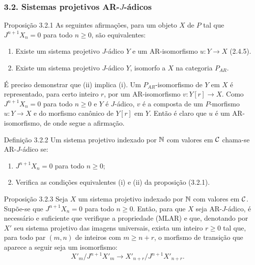 \subsubsection*{3.2. Sistemas projetivos AR-$J$-ádicos}
\begin{statement}{Proposição 3.2.1}
As seguintes afirmações, para um objeto $X$ de $P$ tal que $J^{n+1}X_n=0$ para todo $n\ge0$, são equivalentes:
\begin{enumerate}[label=(\roman*)]
\item Existe um sistema projetivo $J$-ádico $Y$ e um AR-isomorfismo $u:Y\to X$ (2.4.5).
\item Existe um sistema projetivo $J$-ádico $Y$, isomorfo a $X$ na categoria $P_{AR}$.
\end{enumerate}
\end{statement}

\begin{prooftext}[Demonstração]
É preciso demonstrar que (ii) implica (i). Um $P_{AR}$-isomorfismo de $Y$ em $X$ é representado, para certo inteiro $r$, por um AR-isomorfismo $v:Y[r]\to X$. Como $J^{n+1}X_n=0$ para todo $n\ge0$ e $Y$ é $J$-ádico, $v$ é a composta de um $P$-morfismo $u:Y\to X$ e do morfismo canônico de $Y[r]$ em $Y$. Então é claro que $u$ é um AR-isomorfismo, de onde segue a afirmação.
\end{prooftext}

\begin{statement}{Definição 3.2.2}
Um sistema projetivo indexado por $\mathbb N$ com valores em $\mathcal C$ chama-se AR-$J$-ádico se:
\begin{enumerate}[label=(\alph*)]
\item $J^{n+1}X_n=0$ para todo $n\ge0$;
\item Verifica as condições equivalentes (i) e (ii) da proposição (3.2.1).
\end{enumerate}
\end{statement}

\begin{statement}{Proposição 3.2.3}
Seja $X$ um sistema projetivo indexado por $\mathbb N$ com valores em $\mathcal C$. Supõe-se que $J^{n+1}X_n=0$ para todo $n\ge0$. Então, para que $X$ seja AR-$J$-ádico, é necessário e suficiente que verifique a propriedade (MLAR) e que, denotando por $X'$ seu sistema projetivo das imagens universais, exista um inteiro $r\ge0$ tal que, para todo par $(m,n)$ de inteiros com $m\ge n+r$, o morfismo de transição que aparece a seguir seja um isomorfismo:
\[
X'_m/J^{n+1}X'_m\longrightarrow X'_{n+r}/J^{n+1}X'_{n+r}.
\]
\end{statement}
